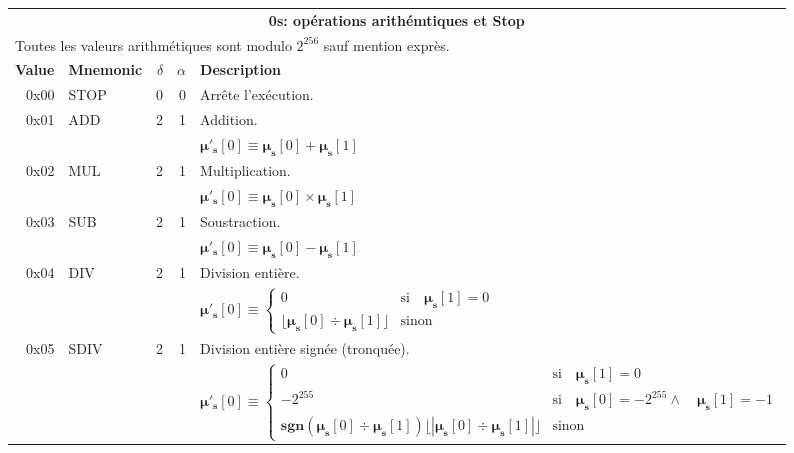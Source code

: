 \documentclass[9pt,oneside]{amsart}
\begin{document}
\begin{tabular*}{\columnwidth}[h]{rlrrl}
\toprule
\multicolumn{5}{c}{\textbf{0s: opérations arithémtiques et Stop}} \\
\multicolumn{5}{l}{Toutes les valeurs arithmétiques sont modulo $2^{256}$ sauf mention exprès.} \vspace{5pt} \\
\textbf{Value} & \textbf{Mnemonic} & $\delta$ & $\alpha$ & \textbf{Description} \vspace{5pt} \\
0x00 & {\small STOP} & 0 & 0 & Arrête l'exécution. \\
\midrule
0x01 & {\small ADD} & 2 & 1 & Addition. \\
&&&& $\boldsymbol{\mu}'_\mathbf{s}[0] \equiv \boldsymbol{\mu}_\mathbf{s}[0] + \boldsymbol{\mu}_\mathbf{s}[1]$ \\
\midrule
0x02 & {\small MUL} & 2 & 1 & Multiplication. \\
&&&& $\boldsymbol{\mu}'_\mathbf{s}[0] \equiv \boldsymbol{\mu}_\mathbf{s}[0] \times \boldsymbol{\mu}_\mathbf{s}[1]$ \\
\midrule
0x03 & {\small SUB} & 2 & 1 & Soustraction. \\
&&&& $\boldsymbol{\mu}'_\mathbf{s}[0] \equiv \boldsymbol{\mu}_\mathbf{s}[0] - \boldsymbol{\mu}_\mathbf{s}[1]$ \\
\midrule
0x04 & {\small DIV} & 2 & 1 & Division entière. \\
&&&& $\boldsymbol{\mu}'_\mathbf{s}[0] \equiv \begin{cases}0 & \text{si} \quad \boldsymbol{\mu}_\mathbf{s}[1] = 0\\ \lfloor\boldsymbol{\mu}_\mathbf{s}[0] \div \boldsymbol{\mu}_\mathbf{s}[1]\rfloor & \text{sinon}\end{cases}$  \\
\midrule
0x05 & {\small SDIV} & 2 & 1 & Division entière signée (tronquée). \\
&&&& $\boldsymbol{\mu}'_\mathbf{s}[0] \equiv \begin{cases}0 & \text{si} \quad \boldsymbol{\mu}_\mathbf{s}[1] = 0\\ -2^{255} & \text{si} \quad \boldsymbol{\mu}_\mathbf{s}[0] = -2^{255} \wedge \quad \boldsymbol{\mu}_\mathbf{s}[1] = -1\\ \mathbf{sgn} (\boldsymbol{\mu}_\mathbf{s}[0] \div \boldsymbol{\mu}_\mathbf{s}[1]) \lfloor |\boldsymbol{\mu}_\mathbf{s}[0] \div \boldsymbol{\mu}_\mathbf{s}[1]| \rfloor & \text{sinon}\end{cases}$  \\

\end{tabular*}
\end{document}
